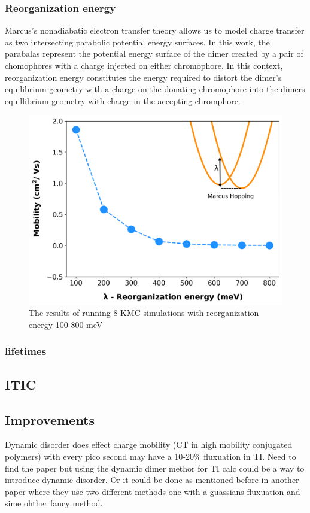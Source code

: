 \subsubsection{Reorganization energy}
Marcus's nonadiabatic electron transfer theory allows us to model charge transfer as two
intersecting parabolic potential energy surfaces. In this work, the parabalas represent the potential energy surface
of the dimer created by a pair of chomophores with a charge injected on either chromophore. In this context, 
reorganization energy constitutes the energy required to distort the dimer's equilibrium geometry with a
charge on the donating chromophore into the dimers equillibrium geometry with charge in the accepting
chromphore. 
\begin{figure}
  \center
  \includegraphics[width=\linewidth, height=\textheight,keepaspectratio]{figures/reorg.png} 
    \caption{The results of running 8 KMC simulations with reorganization energy 100-800 meV}
  \label{fig:reorg}
\end{figure}

\subsubsection{lifetimes}

\subsection{ITIC}

\subsection{Improvements}
Dynamic disorder does effect charge mobility (CT in high mobility conjugated polymers) with every pico second
may have a 10-20\% fluxuation in TI. Need to find the paper but using the dynamic dimer methor for TI calc
could be a way to introduce dynamic disorder. Or it could be done as mentioned before in another paper where
they use two different methods one with a guassians fluxuation and sime ohther fancy method. 

